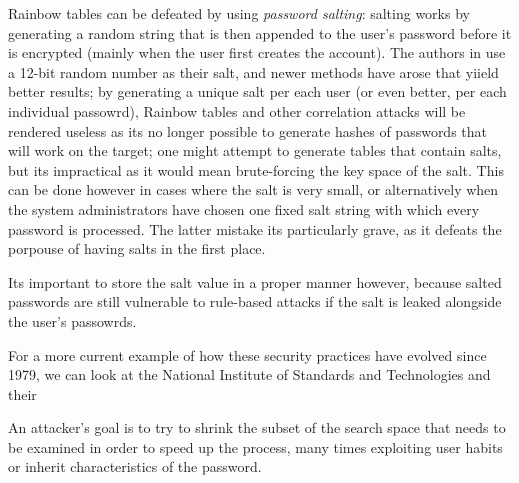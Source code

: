 Rainbow tables can be defeated by using \emph{password salting}: salting works by generating a random string that is then appended to the user's password before it is encrypted (mainly when the user first creates the account). The authors in \cite{Thompson1979} use a 12-bit random number as their salt, and newer methods have arose that yiield better results; by generating a unique salt per each user (or even better, per each individual passowrd), Rainbow tables and other correlation attacks will be rendered useless as its no longer possible to generate hashes of passwords that will work on the target; one might attempt to generate tables that contain salts, but its impractical as it would mean brute-forcing the key space of the salt.
This can be done however in cases where the salt is very small, or alternatively when the system administrators have chosen one fixed salt string with which every password is processed.
The latter mistake its particularly grave, as it defeats the porpouse of having salts in the first place.
   
Its important to store the salt value in a proper manner however, because salted passwords are still vulnerable to rule-based attacks if the salt is leaked alongside the user's passowrds.


For a more current  example of how these security practices have evolved since 1979, we can look at the National Institute of Standards and Technologies and their  

An attacker's goal is to try to shrink the subset of the search space that needs to be examined in order to speed up the process, many times exploiting user habits or inherit characteristics of the password.\newline


